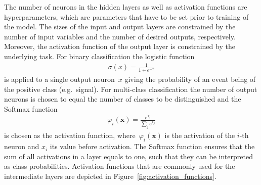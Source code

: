 The number of neurons in the hidden layers as well as activation functions are
hyperparameters, which are parameters that have to be set prior to training of
the model. The sizes of the input and output layers are constrained by the
number of input variables and the number of desired outputs, respectively.
Moreover, the activation function of the output layer is constrained by the
underlying task. For binary classification the logistic function
\begin{align*}
  \sigma(x) = \frac{1}{1 + e^{-x}}
\end{align*}
is applied to a single output neuron~$x$ giving the probability of an event
being of the positive class (e.g.\ signal). For multi-class classification the
number of output neurons is chosen to equal the number of classes to be
distinguished and the Softmax function \cite{esl, bishop}
\begin{align*}
  \varphi_i(\mathbf{x}) = \frac{e^{x_i}}{\sum_j e^{x_j}}
\end{align*}
is chosen as the activation function, where~$\varphi_i(\mathbf{x})$ is the
activation of the $i$-th neuron and $x_i$ its value before activation. The
Softmax function ensures that the sum of all activations in a layer equals to
one, such that they can be interpreted as class probabilities. Activation
functions that are commonly used for the intermediate layers are depicted in
Figure~\ref{fig:activation_functions}.

